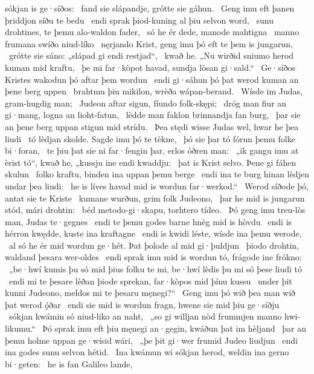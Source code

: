 sókjan is ge·síðos: \hld\ fand sie slápandje,
grótte sie gáhun. \hld\ Geng imu eft þanen
þriddjon síðu te bedu \hld\ endi sprak þiod-kuning
al þiu selvon word, \hld\ sunu drohtines,
te þemu alo-waldon fader, \hld\ só he ér dede,
manode mahtigna \hld\ manno frumana
swíðo niud-líko \hld\ nęrjando Krist,
geng imu þó eft te þem is jungarun, \hld\ grótte sie sáno:
„slápad gi endi restjad“, \hld\ kwað he. „Nu wirðid sniumo herod
kuman mid kraftu, \hld\ þe mi far·kòpot havad,
sundja lòsan gi·sald.“ \hld\ Ge·síðos Kristes
wakodun þó aftar þem wordun \hld\ endi gi·sáhun þó þat werod kuman
an þene berg uppen \hld\ brahtmu þiu mikilon,
wrèða wápan-berand. \hld\ Wísde im Judas,
gram-hugdig man; \hld\ Judeon aftar sigun,
fíundo folk-skępi; \hld\ dróg man fiur an gi·mang,
logna an lioht-fatun, \hld\ lèdde man faklon
brinnandja fan burg, \hld\ þar sie an þene berg uppan
stigun mid strídu. \hld\ Þea stędi wisse Judas wel,
hwar he þea liudi \hld\ tó lèdjan skolde.
Sagde imu þó te tèkne, \hld\ þó sie þar tó fórun
þemu folke bi·foran, \hld\ te þiu þat sie ni far·fengin þar,
erlos óðren man: \hld\ „ik gangu imu at èrist tó“, kwað he,
„kussju ine endi kwaddju: \hld\ þat is Krist selvo.
Þene gi fáhen skulun \hld\ folko kraftu,
binden ina uppan þemu berge \hld\ endi ina te burg hinan
lèdjen undar þea liudi: \hld\ he is líves havad
mid is wordun far·werkod.“ \hld\ Werod síðode þó,
antat sie te Kriste \hld\ kumane wurðun,
grim folk Judeono, \hld\ þar he mid is jungarun stód,
mári drohtin: \hld\ béd metodo-gi·skapu,
torhtero tídeo. \hld\ Þó geng imu treu-lòs man,
Judas te·gegnes \hld\ endi te þemu godes barne
hnèg mid is hòvdu \hld\ endi is hérron kwędde,
kuste ina kraftagne \hld\ endi is kwidi léste,
wísde ina þemu werode, \hld\ al só he ér mid wordun ge·hét.
Þat þolode al mid gi·þuldjun \hld\ þiodo drohtin,
waldand þesara wer-oldes \hld\ endi sprak imu mid is wordun tó,
frágode ine frókno: \hld\ „be·hwí kumis þu só mid þius folku te mi,
be·hwí lèdis þu mi só þese liudi tó \hld\ endi mi te þesare lèðan þiode sprekan,
far·kòpos mid þínu kussu \hld\ under þit kunni Judeono,
meldos mi te þesaru męnegi?“ \hld\ Geng imu þó wið þea man
wið þat werod ǫ́ðar \hld\ endi sie mid is wordun fragn,
hwene sie mid þiu ge·síðju \hld\ sókjan kwámin
só niud-liko an naht, \hld\ „so gi willjan nòd frummjen
manno hwi-likumu.“ \hld\ Þó sprak imu eft þiu męnegi an·gegin,
kwáðun þat im hèljand \hld\ þar an þemu holme uppan
ge·wísid wári, \hld\ „þe þit gi·wer frumid
Judeo liudjun \hld\ endi ina godes sunu
selvon hétid. \hld\ Ina kwámun wi sókjan herod,
weldin ina gerno bi·geten: \hld\ he is fan Galileo lande,
